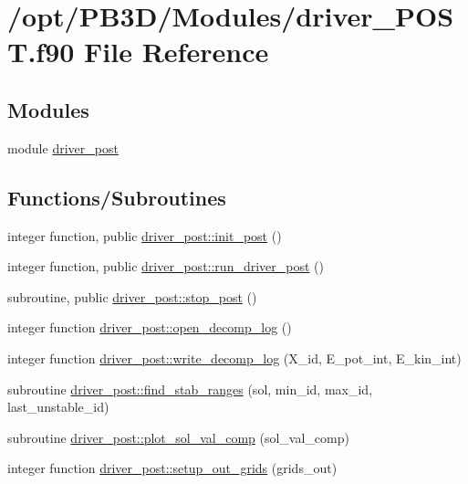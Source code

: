 \hypertarget{driver__POST_8f90}{}\section{/opt/\+P\+B3\+D/\+Modules/driver\+\_\+\+P\+O\+ST.f90 File Reference}
\label{driver__POST_8f90}
\subsection*{Modules}
\begin{DoxyCompactItemize}
\item 
module \hyperlink{namespacedriver__post}{driver\+\_\+post}
\end{DoxyCompactItemize}
\subsection*{Functions/\+Subroutines}
\begin{DoxyCompactItemize}
\item 
integer function, public \hyperlink{namespacedriver__post_af527706d4e696d4e507443d2f74194ef}{driver\+\_\+post\+::init\+\_\+post} ()
\item 
integer function, public \hyperlink{namespacedriver__post_a33b3c6f9018a0ddc92dce77394b8ab37}{driver\+\_\+post\+::run\+\_\+driver\+\_\+post} ()
\item 
subroutine, public \hyperlink{namespacedriver__post_a71f9fb1935222111e1c7cfc15c5d0269}{driver\+\_\+post\+::stop\+\_\+post} ()
\item 
integer function \hyperlink{namespacedriver__post_a5d76f87f131e21b4d74fd5f4a7bbbd6b}{driver\+\_\+post\+::open\+\_\+decomp\+\_\+log} ()
\item 
integer function \hyperlink{namespacedriver__post_a4981c6c0e63b862c92ba240f43e22e77}{driver\+\_\+post\+::write\+\_\+decomp\+\_\+log} (X\+\_\+id, E\+\_\+pot\+\_\+int, E\+\_\+kin\+\_\+int)
\item 
subroutine \hyperlink{namespacedriver__post_a51ecad1032e415d2a8e6e5b97d2c7e09}{driver\+\_\+post\+::find\+\_\+stab\+\_\+ranges} (sol, min\+\_\+id, max\+\_\+id, last\+\_\+unstable\+\_\+id)
\item 
subroutine \hyperlink{namespacedriver__post_af9ce961d2d6825b767a93fdbe8806a1c}{driver\+\_\+post\+::plot\+\_\+sol\+\_\+val\+\_\+comp} (sol\+\_\+val\+\_\+comp)
\item 
integer function \hyperlink{namespacedriver__post_aba7a645f4dd2e08db109cefc6ce0df86}{driver\+\_\+post\+::setup\+\_\+out\+\_\+grids} (grids\+\_\+out)
\end{DoxyCompactItemize}

